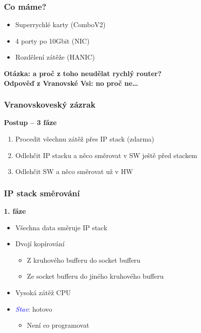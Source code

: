 \documentclass[xcolor=dvipsnames]{beamer}
\let\Oldemph\emph
\renewcommand{\emph}[1]{\textcolor{blue}{\Oldemph{#1}}}
\newcommand{\heading}[1]{\textbf{\textcolor{BurntOrange}{#1}}}
\begin{document}
\begin{frame}
  \frametitle{Co máme?}

  \begin{itemize}
  \item Superrychlé karty (ComboV2)
  \item 4 porty po 10Gbit (NIC)
  \item Rozdělení zátěže (HANIC)
  \end{itemize}

  \pause
  \bigskip

  \begin{center}
  \heading{Otázka: a proč z toho neudělat rychlý router?} \\
  \heading{Odpověď z Vranovské Vsi: no proč ne\ldots}
  \end{center}

\end{frame}

\begin{frame}
  \frametitle{Vranovskoveský zázrak}

  \heading{Postup -- 3 fáze}
  \begin{enumerate}
  \item Procedit všechnu zátěž přes IP stack (zdarma)
  \item Odlehčit IP stacku a něco směrovat v SW ještě před stackem
  \item Odlehčit SW a něco směrovat už v HW
  \end{enumerate}

\end{frame}

\begin{frame}
  \frametitle{IP stack směrování}

  \heading{1. fáze}
  \begin{itemize}
  \item Všechna data směruje IP stack
  \item Dvojí kopírování
  \begin{itemize}
  \item Z kruhového bufferu do socket bufferu
  \item Ze socket bufferu do jiného kruhového bufferu
  \end{itemize}
  \item Vysoká zátěž CPU
  \item \emph{Stav}: hotovo
  \begin{itemize}
  \item Není co programovat
  \end{itemize}
  \end{itemize}

\end{frame}
\end{document}
